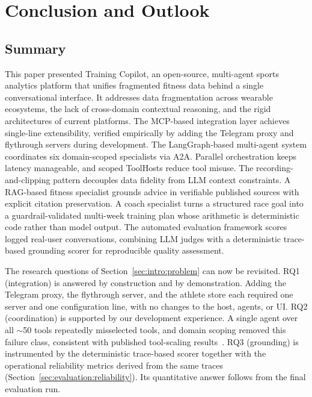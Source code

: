 \section{Conclusion and Outlook}\label{sec:conclusion}

\subsection{Summary}\label{sec:conclusion:summary}

This paper presented Training Copilot, an open-source, multi-agent sports analytics platform that unifies fragmented fitness data behind a single conversational interface. It addresses data fragmentation across wearable ecosystems, the lack of cross-domain contextual reasoning, and the rigid architectures of current platforms. The MCP-based integration layer achieves single-line extensibility, verified empirically by adding the Telegram proxy and flythrough servers during development. The LangGraph-based multi-agent system coordinates six domain-scoped specialists via A2A. Parallel orchestration keeps latency manageable, and scoped ToolHosts reduce tool misuse. The recording-and-clipping pattern decouples data fidelity from LLM context constraints. A RAG-based fitness specialist grounds advice in verifiable published sources with explicit citation preservation. A coach specialist turns a structured race goal into a guardrail-validated multi-week training plan whose arithmetic is deterministic code rather than model output. The automated evaluation framework scores logged real-user conversations, combining LLM judges with a deterministic trace-based grounding scorer for reproducible quality assessment.

The research questions of Section~\ref{sec:intro:problem} can now be revisited. RQ1 (integration) is answered by construction and by demonstration. Adding the Telegram proxy, the flythrough server, and the athlete store each required one server and one configuration line, with no changes to the host, agents, or UI. RQ2 (coordination) is supported by our development experience. A single agent over all $\sim$50 tools repeatedly misselected tools, and domain scoping removed this failure class, consistent with published tool-scaling results~\citep{qu_tool_2024, patil_gorilla_2023}. RQ3 (grounding) is instrumented by the deterministic trace-based scorer together with the operational reliability metrics derived from the same traces (Section~\ref{sec:evaluation:reliability}). Its quantitative answer follows from the final evaluation run.

